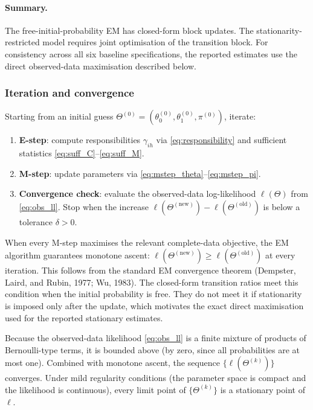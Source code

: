 \paragraph{Summary.} The free-initial-probability EM has closed-form block
updates. The stationarity-restricted model requires joint optimisation of the
transition block. For consistency across all six baseline specifications, the
reported estimates use the direct observed-data maximisation described below.

\subsubsection{Iteration and convergence}
\label{sec:convergence}

Starting from an initial guess \(\Theta^{(0)} = (\theta_0^{(0)},
\theta_1^{(0)}, \pi^{(0)})\), iterate:
\begin{enumerate}
\item \textbf{E-step}: compute responsibilities \(\gamma_{ih}\) via
  \eqref{eq:responsibility} and sufficient statistics
  \eqref{eq:suff_C}--\eqref{eq:suff_M}.
\item \textbf{M-step}: update parameters via
  \eqref{eq:mstep_theta}--\eqref{eq:mstep_pi}.
\item \textbf{Convergence check}: evaluate the observed-data
  log-likelihood \(\ell(\Theta)\) from \eqref{eq:obs_ll}. Stop when the
  increase \(\ell(\Theta^{(\text{new})}) - \ell(\Theta^{(\text{old})})\)
  is below a tolerance \(\delta > 0\).
\end{enumerate}
When every M-step maximises the relevant complete-data objective, the EM
algorithm guarantees monotone ascent:
\(\ell(\Theta^{(\text{new})}) \geq \ell(\Theta^{(\text{old})})\) at
every iteration. This follows from the standard EM convergence theorem
(Dempster, Laird, and Rubin, 1977; Wu, 1983). The closed-form transition
ratios meet this condition when the initial probability is free. They do not
meet it if stationarity is imposed only after the update, which motivates the
exact direct maximisation used for the reported stationary estimates.

Because the observed-data likelihood \eqref{eq:obs_ll} is a finite
mixture of products of Bernoulli-type terms, it is bounded above
(by zero, since all probabilities are at most one). Combined with
monotone ascent, the sequence \(\{\ell(\Theta^{(k)})\}\) converges.
Under mild regularity conditions (the parameter space is compact and the
likelihood is continuous), every limit point of
\(\{\Theta^{(k)}\}\) is a stationary point of \(\ell\).

